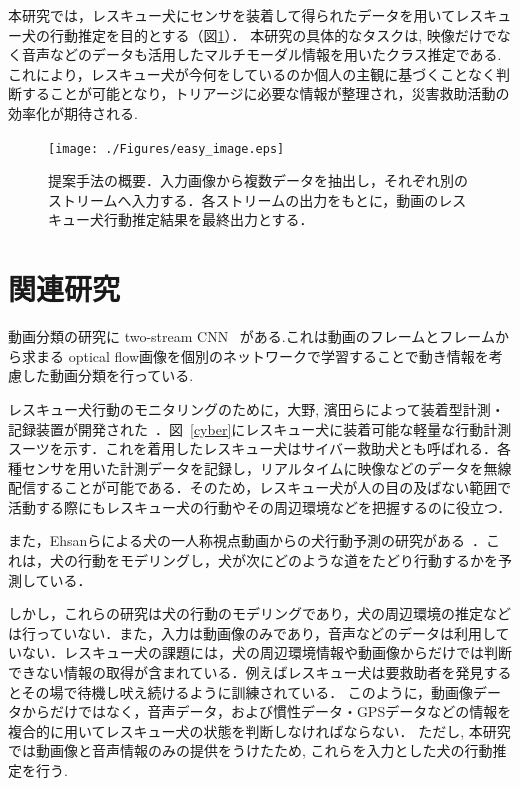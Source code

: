 \documentclass[MIRU,submit]{miru2019j}
\begin{document}
本研究では，レスキュー犬にセンサを装着して得られたデータを用いてレスキュー犬の行動推定を目的とする（図\ref{lite_model}）．
本研究の具体的なタスクは, 映像だけでなく音声などのデータも活用したマルチモーダル情報を用いたクラス推定である.これにより，レスキュー犬が今何をしているのか個人の主観に基づくことなく判断することが可能となり，トリアージに必要な情報が整理され，災害救助活動の効率化が期待される.

\begin{figure}[tb]
 \begin{center}
  \texttt{[image: ./Figures/easy\_image.eps]}
  \caption{提案手法の概要．入力画像から複数データを抽出し，それぞれ別のストリームへ入力する．各ストリームの出力をもとに，動画のレスキュー犬行動推定結果を最終出力とする．}
  \label{lite_model}
 \end{center}
\end{figure}

\section{関連研究}
動画分類の研究に two-stream CNN ~\cite{simonyan2014two}がある.これは動画のフレームとフレームから求まる optical flow画像を個別のネットワークで学習することで動き情報を考慮した動画分類を行っている.

レスキュー犬行動のモニタリングのために，大野, 濱田らによって装着型計測・記録装置が開発された~\cite{dog01}．図~\ref{cyber}にレスキュー犬に装着可能な軽量な行動計測スーツを示す．これを着用したレスキュー犬はサイバー救助犬とも呼ばれる．各種センサを用いた計測データを記録し，リアルタイムに映像などのデータを無線配信することが可能である．そのため，レスキュー犬が人の目の及ばない範囲で活動する際にもレスキュー犬の行動やその周辺環境などを把握するのに役立つ．

また，Ehsanらによる犬の一人称視点動画からの犬行動予測の研究がある~\cite{whoretthedog}．これは，犬の行動をモデリングし，犬が次にどのような道をたどり行動するかを予測している．

しかし，これらの研究は犬の行動のモデリングであり，犬の周辺環境の推定などは行っていない．また，入力は動画像のみであり，音声などのデータは利用していない．レスキュー犬の課題には，犬の周辺環境情報や動画像からだけでは判断できない情報の取得が含まれている．例えばレスキュー犬は要救助者を発見するとその場で待機し吠え続けるように訓練されている．
このように，動画像データからだけではなく，音声データ，および慣性データ・GPSデータなどの情報を複合的に用いてレスキュー犬の状態を判断しなければならない．
ただし, 本研究では動画像と音声情報のみの提供をうけたため, これらを入力とした犬の行動推定を行う.
\end{document}
